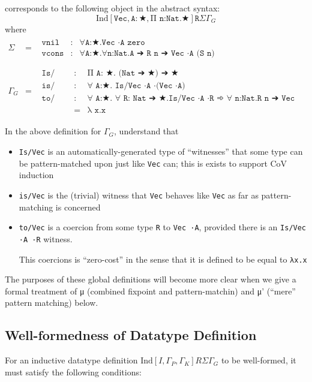 \documentclass{article}
\newcommand{\ann}[2]{#1\! : \! #2}
\newcommand{\indsche}[3]{\ensuremath{\text{Ind}[#1,#2,#3]}}
\begin{document}
corresponds to the following object in the abstract syntax:
\[
  \indsche{\texttt{Vec}}{\ann{\texttt{A}}{★}}{\texttt{Π n:Nat.★}}{\texttt{R}}{\Sigma}{\Gamma_G}
\]
\noindent where
\[
  \begin{array}{lcl}
    \Sigma
    & =
    & \begin{array}{lcl}
        \texttt{vnil} & : & \texttt{∀A:★.Vec ·A zero}
        \\ \texttt{vcons} & : & \texttt{∀A:★.∀n:Nat.A ➔ R n ➔ Vec ·A (S n)}
      \end{array}
    \\ \\ \Gamma_G
    & =
    & \begin{array}{lcl}
        \texttt{Is/Vec} & : & \texttt{Π A: ★. (Nat ➔ ★) ➔ ★}
        \\ \texttt{is/Vec} & : & \texttt{∀ A:★. Is/Vec ·A ·(Vec ·A)}
        \\ \texttt{to/Vec} & : & \texttt{∀ A:★. ∀ R: Nat ➔ ★.Is/Vec ·A ·R ➾ ∀ n:Nat.R n ➔ Vec ·A n}
        \\                 & = & \texttt{λ x.x}
      \end{array}
  \end{array}
\]

\noindent In the above definition for $\Gamma_G$, understand that
\begin{itemize}
  \item \texttt{Is/Vec} is an automatically-generated type of ``witnesses''
    that some type can be pattern-matched upon just like \texttt{Vec} can; this
    is exists to support CoV induction
  \item \texttt{is/Vec} is the (trivial) witness that \texttt{Vec} behaves like
    \texttt{Vec} as far as pattern-matching is concerned
  \item \texttt{to/Vec} is a coercion from some type \texttt{R} to \texttt{Vec ·A},
    provided there is an \texttt{Is/Vec ·A ·R} witness.

    This coercions is ``zero-cost'' in the sense that it is defined to be equal
    to \texttt{λx.x}
\end{itemize}

The purposes of these global definitions will become more clear when we give a
formal treatment of μ (combined fixpoint and pattern-matchin) and μ' (``mere''
pattern matching) below.

\subsection{Well-formedness of Datatype Definition}
For an inductive datatype definition
$\indsche{I}{\Gamma_P}{\Gamma_K}{R}{\Sigma}{\Gamma_G}$ to be well-formed, it must satisfy
the following conditions:
\end{document}
